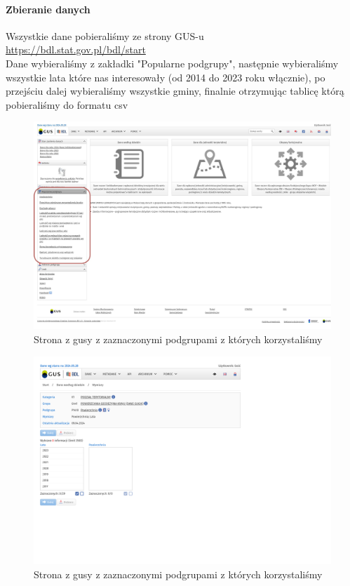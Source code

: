 \documentclass[12pt]{article}
\begin{document}
\paragraph{Zbieranie danych}
Wszystkie dane pobieraliśmy ze strony GUS-u \\
\href{https://bdl.stat.gov.pl/bdl/start}{https://bdl.stat.gov.pl/bdl/start} \\ 
Dane wybieraliśmy z zakładki "Popularne podgrupy", następnie wybieraliśmy wszystkie lata które nas 
interesowały (od 2014 do 2023 roku włącznie), po przejściu dalej wybieraliśmy wszystkie gminy, 
finalnie otrzymując tablicę którą pobieraliśmy do formatu csv \\ 
\begin{figure}[h]
    \caption{Strona z gusy z zaznaczonymi podgrupami z których korzystaliśmy}
    \centering
    \includegraphics[width=1.0\textwidth]{gus}
    \end{figure}
\begin{figure}[h]
    \caption{Strona z gusy z zaznaczonymi podgrupami z których korzystaliśmy}
    \centering
    \includegraphics[width=1.0\textwidth]{dane2}
\end{figure}
\end{document}
